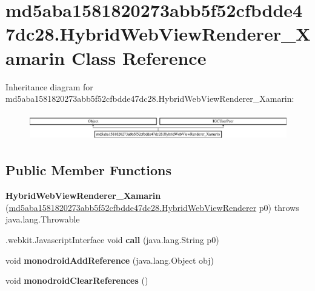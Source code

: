 \hypertarget{classmd5aba1581820273abb5f52cfbdde47dc28_1_1HybridWebViewRenderer__Xamarin}{}\section{md5aba1581820273abb5f52cfbdde47dc28.\+Hybrid\+Web\+View\+Renderer\+\_\+\+Xamarin Class Reference}
\label{classmd5aba1581820273abb5f52cfbdde47dc28_1_1HybridWebViewRenderer__Xamarin}
Inheritance diagram for md5aba1581820273abb5f52cfbdde47dc28.\+Hybrid\+Web\+View\+Renderer\+\_\+\+Xamarin\+:\begin{figure}[H]
\begin{center}
\leavevmode
\includegraphics[height=1.209503cm]{classmd5aba1581820273abb5f52cfbdde47dc28_1_1HybridWebViewRenderer__Xamarin}
\end{center}
\end{figure}
\subsection*{Public Member Functions}
\begin{DoxyCompactItemize}
\item 
\hypertarget{classmd5aba1581820273abb5f52cfbdde47dc28_1_1HybridWebViewRenderer__Xamarin_aa50f4653d1aa1068ae93db80994786b4}{}{\bfseries Hybrid\+Web\+View\+Renderer\+\_\+\+Xamarin} (\hyperlink{classmd5aba1581820273abb5f52cfbdde47dc28_1_1HybridWebViewRenderer}{md5aba1581820273abb5f52cfbdde47dc28.\+Hybrid\+Web\+View\+Renderer} p0)  throws java.\+lang.\+Throwable 	\label{classmd5aba1581820273abb5f52cfbdde47dc28_1_1HybridWebViewRenderer__Xamarin_aa50f4653d1aa1068ae93db80994786b4}

\item 
\hypertarget{classmd5aba1581820273abb5f52cfbdde47dc28_1_1HybridWebViewRenderer__Xamarin_ac7d387c6cdc99184535ea7cd77db105b}{}.webkit.\+Javascript\+Interface void {\bfseries call} (java.\+lang.\+String p0)\label{classmd5aba1581820273abb5f52cfbdde47dc28_1_1HybridWebViewRenderer__Xamarin_ac7d387c6cdc99184535ea7cd77db105b}

\item 
\hypertarget{classmd5aba1581820273abb5f52cfbdde47dc28_1_1HybridWebViewRenderer__Xamarin_a8cca70ae36d787821c71950e92b68783}{}void {\bfseries monodroid\+Add\+Reference} (java.\+lang.\+Object obj)\label{classmd5aba1581820273abb5f52cfbdde47dc28_1_1HybridWebViewRenderer__Xamarin_a8cca70ae36d787821c71950e92b68783}

\item 
\hypertarget{classmd5aba1581820273abb5f52cfbdde47dc28_1_1HybridWebViewRenderer__Xamarin_ae096643e2cafedb33d5af49b0f605096}{}void {\bfseries monodroid\+Clear\+References} ()\label{classmd5aba1581820273abb5f52cfbdde47dc28_1_1HybridWebViewRenderer__Xamarin_ae096643e2cafedb33d5af49b0f605096}

\end{DoxyCompactItemize}


